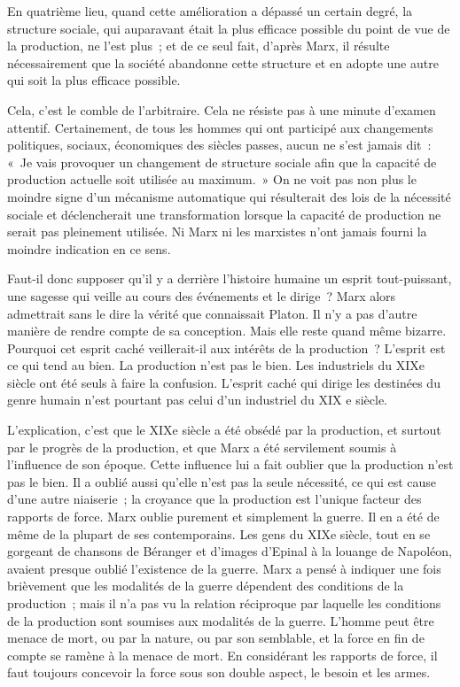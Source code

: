 \documentclass[french,twoside]{book} %
\begin{document}
En quatrième lieu, quand cette amélioration a dépassé un certain degré, la structure sociale, qui auparavant était la plus efficace possible du point de vue de la production, ne l'est plus ; et de ce seul fait, d'après Marx, il résulte nécessairement que la société abandonne cette structure et en adopte une autre qui soit la plus efficace possible.\par
Cela, c'est le comble de l'arbitraire. Cela ne résiste pas à une minute d'examen attentif. Certainement, de tous les hommes qui ont participé aux changements politiques, sociaux, économiques des siècles passes, aucun ne s'est jamais dit : « Je vais provoquer un changement de structure sociale afin que la capacité de production actuelle soit utilisée au maximum. » On ne voit pas non plus le moindre signe d'un mécanisme automatique qui résulterait des lois de la nécessité sociale et déclencherait une transformation lorsque la capacité de production ne serait pas pleinement utilisée. Ni Marx ni les marxistes n'ont jamais fourni la moindre indication en ce sens.\par
Faut-il donc supposer qu'il y a derrière l'histoire humaine un esprit tout-puissant, une sagesse qui veille au cours des événements et le dirige ? Marx alors admettrait sans le dire la vérité que connaissait Platon. Il n'y a pas d'autre manière de rendre compte de sa conception. Mais elle reste quand même bizarre. Pourquoi cet esprit caché veillerait-il aux intérêts de la production ? L'esprit est ce qui tend au bien. La production n'est pas le bien. Les industriels du XIXe siècle ont été seuls à faire la confusion. L'esprit caché qui dirige les destinées du genre humain n'est pourtant pas celui d'un industriel du XIX e siècle.\par
L'explication, c'est que le XIXe siècle a été obsédé par la production, et surtout par le progrès de la production, et que Marx a été servilement soumis à l'influence de son époque. Cette influence lui a fait oublier que la production n'est pas le bien. Il a oublié aussi qu'elle n'est pas la seule nécessité, ce qui est cause d'une autre niaiserie ; la croyance que la production est l'unique facteur des rapports de force. Marx oublie purement et simplement la guerre. Il en a été de même de la plupart de ses contemporains. Les gens du XIXe siècle, tout en se gorgeant de chansons de Béranger et d'images d'Epinal à la louange de Napoléon, avaient presque oublié l'existence de la guerre. Marx a pensé à indiquer une fois brièvement que les modalités de la guerre dépendent des conditions de la production ; mais il n'a pas vu la relation réciproque par laquelle les conditions de la production sont soumises aux modalités de la guerre. L'homme peut être menace de mort, ou par la nature, ou par son semblable, et la force en fin de compte se ramène à la menace de mort. En considérant les rapports de force, il faut toujours concevoir la force sous son double aspect, le besoin et les armes.\par
\end{document}
